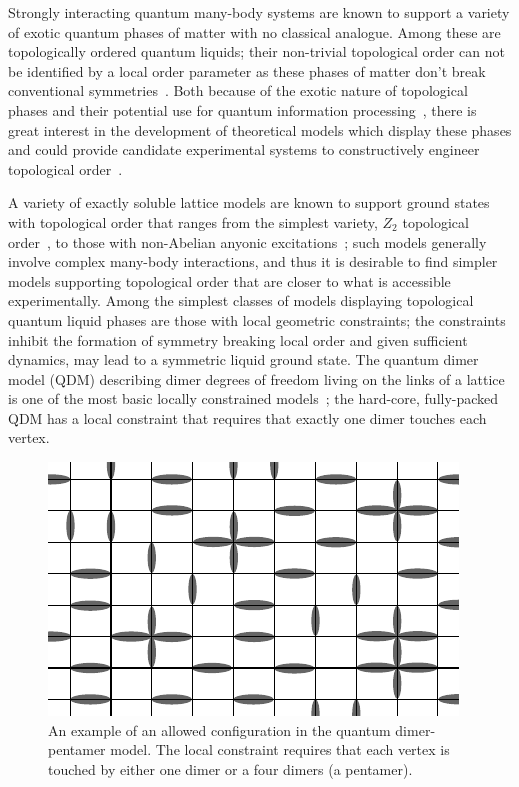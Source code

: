 \documentclass[twocolumn,prb,aps,floatfix,superscriptaddress]{revtex4-1}
\begin{document}
Strongly interacting quantum many-body systems are known to support a variety of exotic quantum phases of matter with no classical analogue. Among these are topologically ordered quantum liquids; their non-trivial topological order can not be identified by a local order parameter as these phases of matter don't break conventional symmetries~\cite{Wen1990,Nayak2008}. Both because of the exotic nature of topological phases and their potential use for quantum information processing~\cite{Freedman2001,Kitaev2003}, there is great interest in the development of theoretical models which display these phases and could provide candidate experimental systems to constructively engineer topological order~\cite{Duan2003,Jaksch2005,Lewenstein2007,Jiang2008d,Weimer2010a,Herdman2010c,Fowler2012a}. 

A variety of exactly soluble lattice models are known to support ground states with topological order that ranges from the simplest variety, $Z_2$ topological order~\cite{Kitaev2003,Wen2003}, to those with non-Abelian anyonic excitations~\cite{Levin2005a,Kitaev2006a}; such models generally involve complex many-body interactions, and thus it is desirable to find simpler models supporting topological order that are closer to what is accessible experimentally. Among the simplest classes of models displaying topological quantum liquid phases are those with local geometric constraints; the constraints inhibit the formation of symmetry breaking local order and given sufficient dynamics, may lead to a symmetric liquid ground state. The quantum dimer model (QDM) describing dimer degrees of freedom living on the links of a lattice is one of the most basic locally constrained models~\cite{Rokhsar1988,Moessner2008}; the hard-core, fully-packed QDM has a local constraint that requires that exactly one dimer touches each vertex.

\begin{figure}[t!]
    \centering
    \includegraphics[width=0.9\columnwidth]{QDPM_ex_config.pdf}
    \caption{An example of an allowed configuration in the quantum dimer-pentamer model. The local constraint requires that each vertex is touched by either one dimer or a four dimers (a pentamer).}
    \label{fig:QDPMex}
\end{figure}
\end{document}
